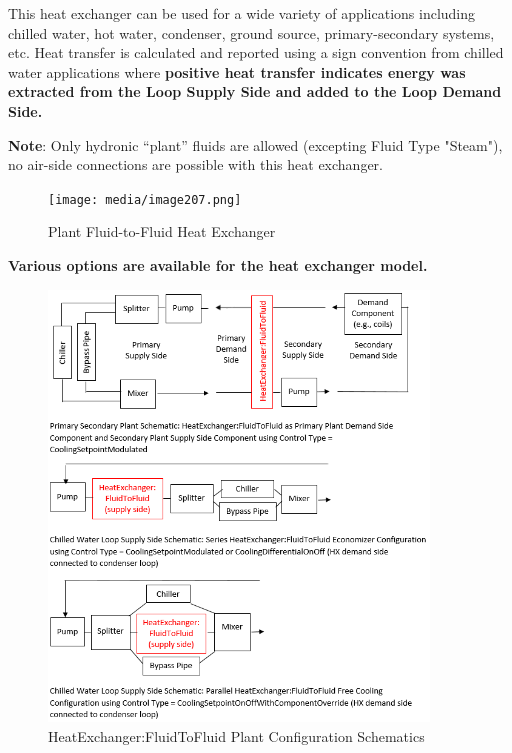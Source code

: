 This heat exchanger can be used for a wide variety of applications including chilled water, hot water, condenser, ground source, primary-secondary systems, etc.
Heat transfer is calculated and reported using a sign convention from chilled water applications
where \textbf{positive heat transfer indicates energy was extracted from the Loop Supply Side and added to the Loop Demand Side.}

\textbf{Note}: Only hydronic ``plant'' fluids are allowed (excepting Fluid Type "Steam"), no air-side connections are possible with this heat exchanger.

\begin{figure}[hbtp] %
\centering
\texttt{[image: media/image207.png]}
\caption{Plant Fluid-to-Fluid Heat Exchanger \protect \label{fig:plant-fluid-to-fluid-heat-exchanger}}
\end{figure}

\textbf{Various options are available for the heat exchanger model.}

\begin{figure}[hbtp]
\centering
\includegraphics[width=0.9\textwidth, height=0.9\textheight, keepaspectratio=true]{media/HeatExchanger-FluidToFluid-Schematics.png}
\caption{HeatExchanger:FluidToFluid Plant Configuration Schematics \protect \label{fig:plant-fluid-to-fluid-heat-exchanger-plant-schematics}}
\end{figure}

